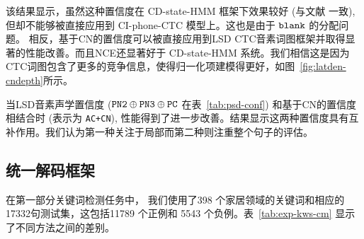 
该结果显示，虽然这种置信度在 CD-state-HMM 框架下效果较好 (与文献 \cite{evermann2000large}\cite{wessel2001confidence}一致), 但却不能够被直接应用到 CI-phone-CTC 模型上。这也是由于 {$\tt blank$} 的分配问题。
相反，基于CN的置信度可以被直接应用到LSD CTC音素词图框架并取得显著的性能改善。而且NCE还显著好于 CD-state-HMM 系统。我们相信这是因为CTC词图包含了更多的竞争信息，使得归一化项建模得更好，如图~\ref{fig:latden-cndepth}所示。


当LSD音素声学置信度 ($\tt PN2\oplus PN3\oplus PC$ 在表~\ref{tab:psd-conf}) 和基于CN的置信度相结合时 (表示为 {\tt AC+CN}), 性能得到了进一步改善。结果显示这两种置信度具有互补作用。我们认为第一种关注于局部而第二种则注重整个句子的评估。



 \subsection{统一解码框架}
 \label{Sec:exp-kws}
 在第一部分关键词检测任务中， 我们使用了398 个家居领域的关键词和相应的17332句测试集，这包括11789 个正例和 5543 个负例。表~\ref{tab:exp-kws-cm} 显示了不同方法之间的差别。


